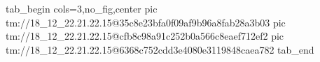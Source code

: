  
 
 
 
 

\qqSecOrig


\ifcmt
  tab_begin cols=3,no_fig,center
    pic tm://18_12_22.21.22.15@35c8e23bfa0f09af9b96a8fab28a3b03
    pic tm://18_12_22.21.22.15@cfb8c98a91c252b0a566c8eaef712ef2
    pic tm://18_12_22.21.22.15@6368c752cdd3e4080e3119848caea782
  tab_end
\fi

